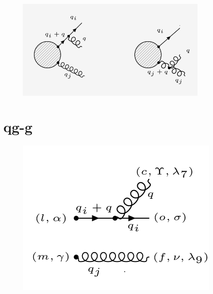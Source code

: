 

\begin{figure}[ht!]
\centering
\includegraphics[width=0.85\textwidth]{images/QGG/QGGDiagrams.png}
\end{figure}
\pagebreak
\section{qg-g}
\begin{figure}[ht!]
\centering
\includegraphics[scale=0.7]{images/QGG/qggM1.png}
\end{figure}
%
